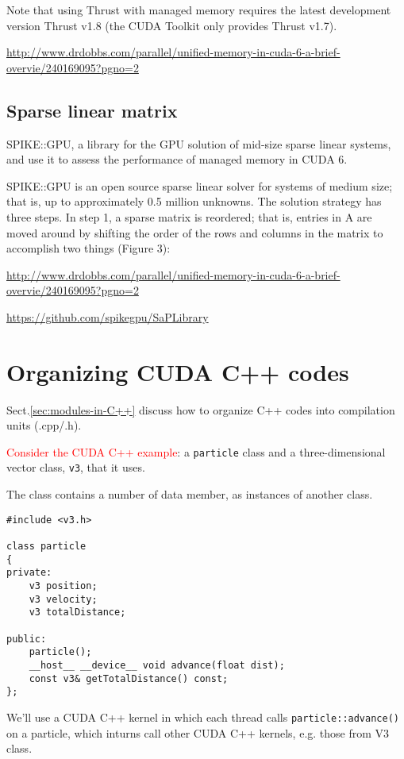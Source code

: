 Note that using Thrust with managed memory requires the latest development
version Thrust v1.8 (the CUDA Toolkit only provides Thrust v1.7).


\url{http://www.drdobbs.com/parallel/unified-memory-in-cuda-6-a-brief-overvie/240169095?pgno=2}

\subsection{Sparse linear matrix}

SPIKE::GPU, a library for the GPU solution of mid-size sparse linear systems, and use it to assess the performance of managed memory in CUDA 6.


SPIKE::GPU is an open source sparse linear solver for systems of medium size;
that is, up to approximately 0.5 million unknowns. The solution strategy has
three steps. In step 1, a sparse matrix is reordered; that is, entries in A are
moved around by shifting the order of the rows and columns in the matrix to
accomplish two things (Figure 3):

\url{http://www.drdobbs.com/parallel/unified-memory-in-cuda-6-a-brief-overvie/240169095?pgno=2}

\url{https://github.com/spikegpu/SaPLibrary}


\section{Organizing CUDA C++ codes}


Sect.\ref{sec:modules-in-C++} discuss how to organize C++ codes into compilation
units (.cpp/.h).

\textcolor{red}{Consider the CUDA C++ example}:  a \verb!particle! class and a three-dimensional
vector class, \verb!v3!, that it uses.

The class contains a number of data member, as instances of another class.
\begin{verbatim}
#include <v3.h>

class particle
{
private:
    v3 position;
    v3 velocity;
    v3 totalDistance;

public:
    particle();
    __host__ __device__ void advance(float dist);
    const v3& getTotalDistance() const;
};
\end{verbatim}

We’ll use a CUDA C++ kernel in which each thread calls
\verb!particle::advance()! on a particle, which inturns call other CUDA C++
kernels, e.g. those from V3 class.

